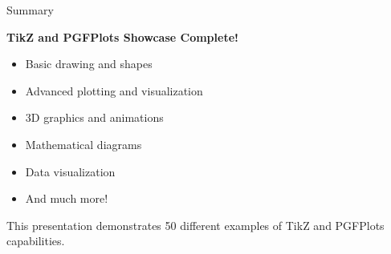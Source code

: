 \begin{frame}{Summary}
\begin{center}
\Large
\textbf{TikZ and PGFPlots Showcase Complete!}

\vspace{1cm}

\begin{itemize}
    \item Basic drawing and shapes
    \item Advanced plotting and visualization
    \item 3D graphics and animations
    \item Mathematical diagrams
    \item Data visualization
    \item And much more!
\end{itemize}

\vspace{1cm}

\footnotesize
This presentation demonstrates 50 different examples of TikZ and PGFPlots capabilities.
\end{center}
\end{frame}